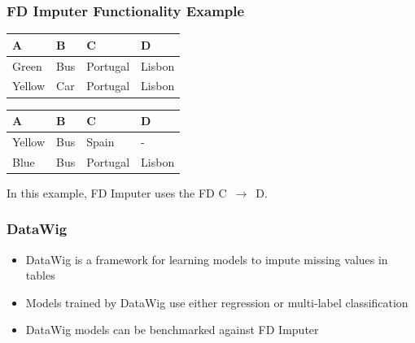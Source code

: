 \documentclass{beamer}
\begin{document}
\begin{frame}
    \frametitle{FD Imputer Functionality Example}
\begin{table}[ht]
    \begin{subtable}[c]{0.9\textwidth}
        \centering
        \begin{tabular}{llll}
            \textsc{A} & \textsc{B} & \textsc{C} & \textsc{D}  \\
        \toprule
        \toprule
            Green & Bus & Portugal & Lisbon \\
            Yellow & Car & Portugal & Lisbon \\
        \bottomrule
        \bottomrule
        \end{tabular}
    \end{subtable}
    \newline
    \vspace*{0.3 cm}
    \newline
\begin{subtable}[c]{0.9\textwidth}
        \centering
        \begin{tabular}{llll}
        \textsc{A} & \textsc{B} & \textsc{C} & \textsc{D} \\
        \toprule
        \toprule
        Yellow & Bus & Spain & - \\
        Blue & Bus & Portugal & Lisbon \\
        \bottomrule
        \bottomrule
        \end{tabular}
    \end{subtable}
\end{table}
In this example, FD Imputer uses the FD \textsc{C}~$\rightarrow$~\textsc{D}.
\end{frame}

\begin{frame}
    \frametitle{DataWig}
    \begin{itemize}
        \item DataWig is a framework for learning models to impute missing values in tables
        \item Models trained by DataWig use either regression or multi-label classification
        \item DataWig models can be benchmarked against FD Imputer
    \end{itemize}
\end{frame}
\end{document}
